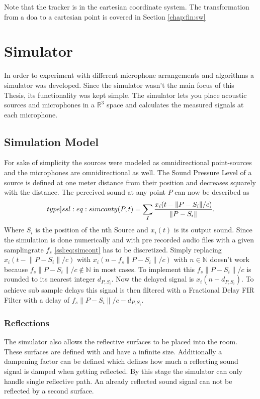 Note that the tracker is in the cartesian coordinate system.
The transformation from a \acrshort*{doa} to a cartesian point is
covered in Section \ref*{chap:fin:sw}

\newpage
\section{Simulator}
In order to experiment with different microphone arrangements and algorithms a simulator was developed.
Since the simulator wasn't the main focus of this Thesis, its functionality was kept simple.
The simulator lets you place acoustic sources and microphones in a $\mathbb{R}^3$ space and calculates
the measured signals at each microphone.

\subsection{Simulation Model}
For sake of simplicity the sources were modeled as omnidirectional point-sources and the
microphones are omnidirectional as well.
The Sound Pressure Level of a source is defined at one meter distance from their position and decreases
squarely with the distance.
The perceived sound at any point $P$ can now be described as
\begin{equation}
	\label[type]{ssl:eq:simcont}
	y(P, t) = \sum_{I} \frac{x_i(t - \lVert P - S_i\rVert/c)}{\lVert P - S_i\rVert}.
\end{equation}
Where $S_i$ is the position of the nth Source and $x_i(t)$ is its output sound.
Since the simulation is done numerically and with pre recorded audio files with a given
samplingrate $f_s$ \eqref{ssl:eq:simcont} has to be discretized.
Simply replacing $x_i(t - \lVert P - S_i\rVert/c)$ with
$x_i(n - f_s \lVert P - S_i\rVert/c)$ with
$n \in \mathbb{N}$ doesn't work because
$f_s \lVert P - S_i\rVert/c \not \in \mathbb{N}$ in most cases.
To implement this $f_s \lVert P - S_i\rVert/c$ is rounded to
its nearest integer $d_{P,S_i}$.
Now the delayed signal is $x_i(n - d_{P,S_i})$.
To achieve sub sample delays this signal is then filtered
with a Fractional Delay FIR Filter with a delay of
$f_s \lVert P - S_i\rVert/c - d_{P,S_i}$.

\subsubsection{Reflections}
The simulator also allows the reflective surfaces to be placed into the room.
These surfaces are defined with  and have a infinite size.
Additionally a dampening factor can be defined which defines how much 
a reflecting sound signal is damped when getting reflected.
By this stage the simulator can only handle single reflective path. 
An already reflected sound signal can not be reflected by a second surface.


